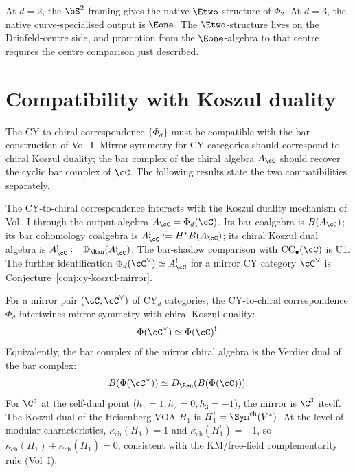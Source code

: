 At \(d=2\), the \(\bS^2\)-framing gives the native \(\Etwo\)-structure
of \(\Phi_2\).  At \(d=3\), the native curve-specialised output is
\(\Eone\).  The \(\Etwo\)-structure lives on the Drinfeld-centre side,
and promotion from the \(\Eone\)-algebra to that centre requires the
centre comparison just described.


\section{Compatibility with Koszul duality}
\label{sec:cy-koszul-compat}

The CY-to-chiral correspondence $\{\Phi_d\}$ must be compatible with
the bar construction of Vol~I. Mirror symmetry for CY
categories should correspond to chiral Koszul duality; the bar complex
of the chiral algebra $A_\cC$ should recover the cyclic bar complex of
$\cC$. The following results state the two compatibilities separately.

The CY-to-chiral correspondence interacts with the Koszul duality mechanism
of Vol.~I through the output algebra \(A_\cC=\Phi_d(\cC)\). Its bar
coalgebra is \(B(A_\cC)\); its bar cohomology coalgebra is
\(A_\cC^i:=H^*B(A_\cC)\); its chiral Koszul dual algebra is
\(A_\cC^!:=\mathbb D_{\Ran}(A_\cC^i)\). The bar-shadow comparison with
\(\mathrm{CC}_\bullet(\cC)\) is U1. The further identification
\(\Phi_d(\cC^\vee)\simeq A_\cC^!\) for a mirror CY category
\(\cC^\vee\) is Conjecture~\ref{conj:cy-koszul-mirror}.

\begin{conjecture}
\label{conj:cy-koszul-mirror}
\ClaimStatusConjectured
For a mirror pair $(\cC, \cC^\vee)$ of CY$_d$ categories, the CY-to-chiral correspondence $\Phi_d$ intertwines mirror symmetry with chiral Koszul duality:
\[
 \Phi(\cC^\vee) \simeq \Phi(\cC)^!.
\]
Equivalently, the bar complex of the mirror chiral algebra is the Verdier dual of the bar complex:
\[
 B(\Phi(\cC^\vee)) \simeq D_{\Ran}(B(\Phi(\cC))).
\]
For $\C^3$ at the self-dual point ($h_1 = 1, h_2 = 0, h_3 = -1$), the mirror is $\C^3$ itself. The Koszul dual of the Heisenberg VOA $H_1$ is $H_1^! = \Sym^{\mathrm{ch}}(V^*)$. At the level of modular characteristics, $\kappa_{\mathrm{ch}}(H_1) = 1$ and $\kappa_{\mathrm{ch}}(H_1^!) = -1$, so $\kappa_{\mathrm{ch}}(H_1) + \kappa_{\mathrm{ch}}(H_1^!) = 0$, consistent with the KM/free-field complementarity rule (Vol~I).
\end{conjecture}

